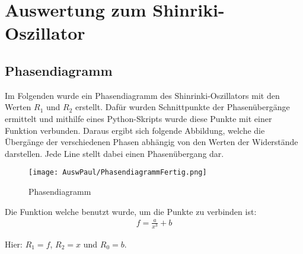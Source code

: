 \section{Auswertung zum Shinriki-Oszillator}

\subsection{Phasendiagramm}
Im Folgenden wurde ein Phasendiagramm des Shinrinki-Oszillators mit den Werten \(R_1\) und \(R_2\) erstellt. Dafür wurden Schnittpunkte der Phasenübergänge ermittelt und mithilfe eines Python-Skripts wurde diese Punkte mit einer Funktion verbunden. Daraus ergibt sich folgende Abbildung, welche die Übergänge der verschiedenen Phasen abhängig von den Werten der Widerstände darstellen. Jede Line stellt dabei einen Phasenübergang dar.

\begin{figure}[h]
    \centering
    \texttt{[image: AuswPaul/PhasendiagrammFertig.png]}
    \label{fig:Phasendiagramm}
    \caption{Phasendiagramm}
\end{figure}

Die Funktion welche benutzt wurde, um die Punkte zu verbinden ist:
\begin{align}
    f = \frac{a}{x^3} +b
\end{align}

Hier: $R_1 = f$, $R_2 = x$ und $R_0 = b$.


